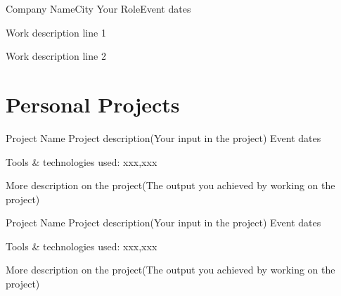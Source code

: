 \documentclass{article}
\begin{document}
    \vspace{-3.0mm}
    
    \resumeSubheading
      {Company Name}{City}
      {Your Role}{Event dates}
      \vspace{-2.0mm}
      \resumeItemListStart
    \item {Work description line 1}
    \item {Work description line 2}
    \resumeItemListEnd
      
  \resumeSubHeadingListEnd
\vspace{-8.5mm}



\section{\textbf{Personal Projects}}
\resumeSubHeadingListStart

    \resumeProject
      {Project Name} %
      {Project description(Your input in the project)} %
      {Event dates} %

      \resumeItemListStart
        \item {Tools \& technologies used: xxx,xxx}
        \item {More description on the project(The output you achieved by working on the project)}
    \resumeItemListEnd
    \vspace{-2mm}
    
    \resumeProject
      {Project Name} %
      {Project description(Your input in the project)} %
      {Event dates} %

      \resumeItemListStart
        \item {Tools \& technologies used: xxx,xxx}
        \item {More description on the project(The output you achieved by working on the project)}
    \resumeItemListEnd
    \vspace{-2mm}
    
      
  \resumeSubHeadingListEnd
\vspace{-5.5mm}



\end{document}

